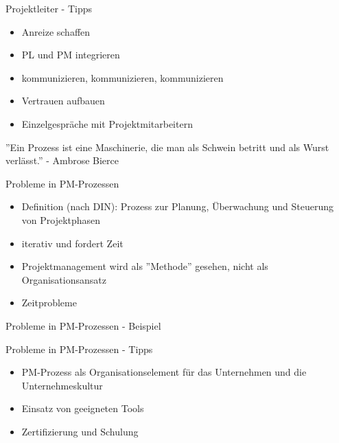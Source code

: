 \documentclass[12pt]{beamer}
\begin{document}
	\begin{frame}{Projektleiter - Tipps}
		\begin{itemize}
			\item{Anreize schaffen}
			\item{PL und PM integrieren}
			\item{kommunizieren, kommunizieren, kommunizieren}
			\item{Vertrauen aufbauen}
			\item{Einzelgespräche mit Projektmitarbeitern}
		\end{itemize}
	\end{frame}

	\thispagestyle{empty}
	\begin{frame}
		
		''Ein Prozess ist eine Maschinerie, die man als Schwein betritt und als Wurst verlässt.''  - Ambrose Bierce
		
	\end{frame}
	
	\begin{frame}{Probleme in PM-Prozessen}
		\begin{itemize}
			\item{Definition (nach DIN): Prozess zur Planung, Überwachung und Steuerung von Projektphasen}
			\item{iterativ und fordert Zeit}
			\item{Projektmanagement wird als ''Methode'' gesehen, nicht als Organisationsansatz}
			\item{Zeitprobleme}
		\end{itemize}
	\end{frame}
	
	\begin{frame}{Probleme in PM-Prozessen - Beispiel}
	
	\end{frame}
	
	\begin{frame}{Probleme in PM-Prozessen - Tipps}
		\begin{itemize}
			\item{PM-Prozess als Organisationselement für das Unternehmen und die Unternehmeskultur}
			\item{Einsatz von geeigneten Tools}
			\item{Zertifizierung und Schulung}
		\end{itemize}
		
	\end{frame}
	
\end{document}
